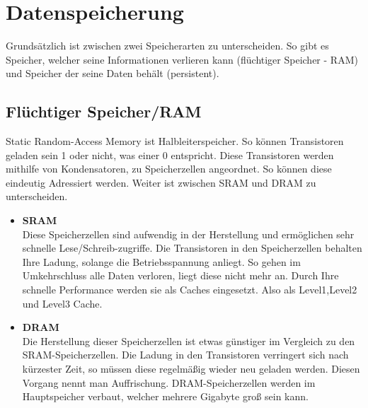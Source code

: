 \documentclass[10pt,a4paper]{article} %
\begin{document}
\section{Datenspeicherung}
Grundsätzlich ist zwischen zwei Speicherarten zu unterscheiden. So gibt es Speicher, welcher seine Informationen verlieren kann (flüchtiger Speicher - RAM) und Speicher der seine Daten behält (persistent).
\subsection{Flüchtiger Speicher/RAM}
Static Random-Access Memory ist Halbleiterspeicher. So können Transistoren geladen sein 1 oder nicht, was einer 0 entspricht.
Diese Transistoren werden mithilfe von Kondensatoren, zu Speicherzellen angeordnet. So können diese eindeutig Adressiert werden. Weiter ist zwischen SRAM und DRAM zu unterscheiden.\cite[5]{Schuhmann}
\begin{itemize}
\item
\textbf{SRAM}\\
Diese Speicherzellen sind aufwendig in der Herstellung und ermöglichen sehr schnelle Lese/Schreib-zugriffe. Die Transistoren in den Speicherzellen behalten Ihre Ladung, solange die Betriebsspannung anliegt. So gehen im Umkehrschluss alle Daten verloren, liegt diese nicht mehr an. Durch Ihre schnelle Performance werden sie als Caches eingesetzt. Also als Level1,Level2 und Level3 Cache.\cite[7]{Schuhmann}
\item
\textbf{DRAM}\\
Die Herstellung dieser Speicherzellen ist etwas günstiger im Vergleich zu den SRAM-Speicherzellen. Die Ladung in den Transistoren verringert sich nach kürzester Zeit, so müssen diese regelmäßig wieder neu geladen werden. Diesen Vorgang nennt man Auffrischung. DRAM-Speicherzellen werden im Hauptspeicher verbaut, welcher mehrere Gigabyte groß sein kann.
\end{itemize}
\end{document}

